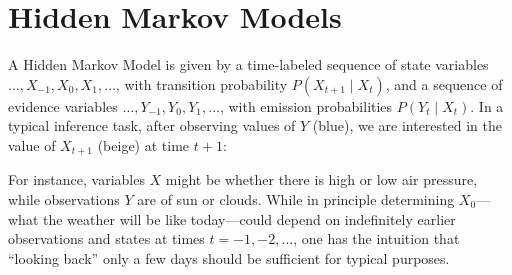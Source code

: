 \documentclass[10pt,letterpaper]{article}
\newcommand{\red}[1]{\textcolor{Red}{#1}}
\begin{document}
\section{Hidden Markov Models}

A Hidden Markov Model is given by a time-labeled sequence of state variables $\dots,X_{-1},X_{0},X_1,\dots$, %
with transition probability $P(X_{t+1}\mid X_t)$, and a sequence of evidence variables $\dots,Y_{-1},Y_0,Y_1,\dots$, with emission probabilities $P(Y_t\mid X_t)$. In a typical inference task, after observing  values of $Y$ (blue), we are interested in the value of $X_{t+1}$ (beige) at time $t+1$:

\begin{figure}[h] 
\begin{center}
\end{center} 
\end{figure} 
\noindent For instance, variables $X$ might be whether there is high or low air pressure, while observations $Y$ are of sun or clouds. While in principle determining $X_{0}$---what the weather will be like today---could depend on indefinitely earlier observations and states at times $t=-1,-2,\dots$, one has the intuition that ``looking back'' only a few days should be sufficient for typical purposes.
\end{document}
